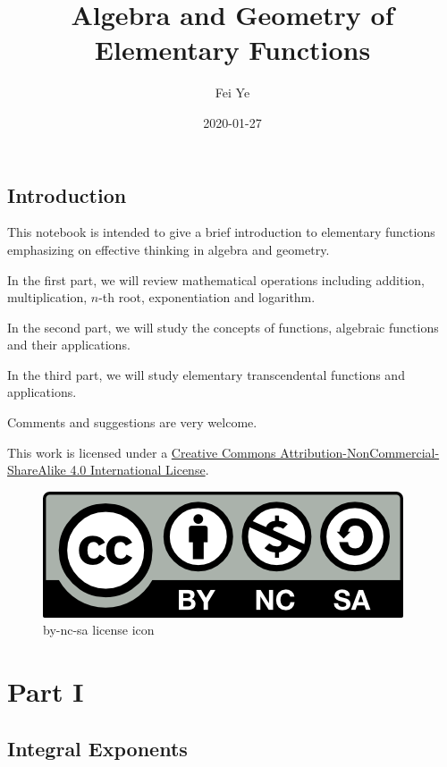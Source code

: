 \documentclass[en,11pt]{latex/elegantbookr}
\title{Algebra and Geometry of Elementary Functions}
\author{Fei Ye}
\date{2020-01-27}
\theoremstyle{definition}
\theoremstyle{definition}
\theoremstyle{definition}
\theoremstyle{remark}
\begin{document}
\maketitle

{
\setcounter{tocdepth}{2}
\tableofcontents
}
\hypertarget{introduction}{%
\chapter*{Introduction}\label{introduction}}

This notebook is intended to give a brief introduction to elementary functions emphasizing on effective thinking in algebra and geometry.

In the first part, we will review mathematical operations including addition, multiplication, \(n\)-th root, exponentiation and logarithm.

In the second part, we will study the concepts of functions, algebraic functions and their applications.

In the third part, we will study elementary transcendental functions and applications.

Comments and suggestions are very welcome.

This work is licensed under a \href{https://creativecommons.org/licenses/by-nc-sa/4.0/}{Creative Commons Attribution-NonCommercial-ShareAlike 4.0 International License}.

\begin{figure}
\centering
\includegraphics{figs/by-nc-sa.png}
\caption{by-nc-sa license icon}
\end{figure}

\hypertarget{part-part-i}{%
\part*{Part I}\label{part-part-i}}

\hypertarget{integral-exponents}{%
\chapter{Integral Exponents}\label{integral-exponents}}
\end{document}
